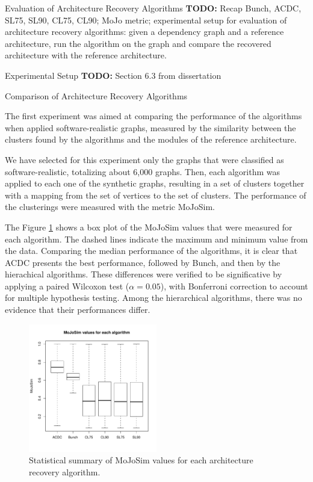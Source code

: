 \documentclass[11pt,twocolumn,a4paper,english]{article}
\newcommand{\TODO}{\textbf{TODO:} }
\begin{document}

\begin{section}{Evaluation of Architecture Recovery Algorithms}
	\TODO Recap Bunch, ACDC, SL75, SL90, CL75, CL90; MoJo metric; experimental setup for evaluation of architecture recovery algorithms: given a dependency graph and a reference architecture, run the algorithm on the graph and compare the recovered architecture with the reference architecture.

\begin{subsection}{Experimental Setup}
	\TODO Section 6.3 from dissertation
	
\end{subsection}

\begin{subsection}{Comparison of Architecture Recovery Algorithms}
	
	The first experiment was aimed at comparing the performance of the algorithms when applied software-realistic graphs, measured by the similarity between the clusters found by the algorithms and the modules of the reference architecture.
	
	We have selected for this experiment only the graphs that were classified as software-realistic, totalizing about 6,000 graphs. Then, each algorithm was applied to each one of the synthetic graphs, resulting in a set of clusters together with a mapping from the set of vertices to the set of clusters. The performance of the clusterings were measured with the metric MoJoSim.
	
	The Figure \ref{fig:exp-algorithms} shows a box plot of the MoJoSim values that were measured for each algorithm. The dashed lines indicate the maximum and minimum value from the data. Comparing the median performance of the algorithms, it is clear that ACDC presents the best performance, followed by Bunch, and then by the hierachical algorithms. These differences were verified to be significative by applying a paired Wilcoxon test ($\alpha = 0.05$), with Bonferroni correction to account for multiple hypothesis testing. Among the hierarchical algorithms, there was no evidence that their performances differ.
	
	\begin{figure}[htbp]
		\centering
			\includegraphics[width=0.5\textwidth]{figures/exp-algorithms}
		\caption{Statistical summary of MoJoSim values for each architecture recovery algorithm.}
		\label{fig:exp-algorithms}
	\end{figure}
	

\end{subsection}
\end{section}
\end{document}
